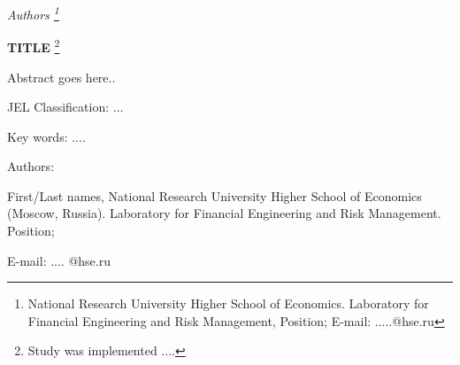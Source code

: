 \documentclass[12pt, a4paper]{article}
\begin{document}
\begin{titlepage}
	\thispagestyle{empty}

\begin{center}
{\fontsize{14}{16.8}\selectfont \it Authors \footnote{\fontsize{9}{10.8} \selectfont National Research University Higher School of Economics. Laboratory for Financial Engineering and Risk Management, Position; E-mail: .....@hse.ru}}
\bigskip

{\fontsize{16}{20.736}\selectfont \bfseries TITLE}
\footnote{\fontsize{9}{10.8} \selectfont Study was implemented ....}

\end{center}

\noindent Abstract goes here..
\bigskip

\noindent JEL Classification: ...
\bigskip

\noindent Key words: ....
\end{titlepage}


\setcounter{page}{3}

 	

%


\pagebreak

\noindent Authors:

\noindent First/Last names, National Research University Higher School of Economics (Moscow, Russia). Laboratory for Financial Engineering and Risk Management. Position;

\noindent E-mail: .... @hse.ru
\bigskip



\end{document}
